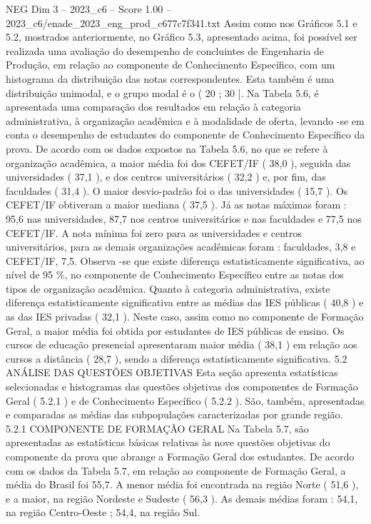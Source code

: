 \begin{textsample}{NEG Dim 3 – 2023\_c6 – Score 1.00 – 2023\_c6/enade\_2023\_eng\_prod\_c677c7f341.txt}
Assim como nos Gráficos 5.1 e 5.2, mostrados anteriormente, no Gráfico 5.3, apresentado acima, foi possível ser realizada uma avaliação do desempenho de concluintes de Engenharia de Produção, em relação ao componente de Conhecimento Específico, com um histograma da distribuição das notas correspondentes.
Esta também é uma distribuição unimodal, e o grupo modal é o ( 20 ; 30 ].
Na Tabela 5.6, é apresentada uma comparação dos resultados em relação à categoria administrativa, à organização acadêmica e à modalidade de oferta, levando -se em conta o desempenho de estudantes do componente de Conhecimento Específico da prova.
De acordo com os dados expostos na Tabela 5.6, no que se refere à organização acadêmica, a maior média foi dos CEFET/IF ( 38,0 ), seguida das universidades ( 37,1 ), e dos centros universitários ( 32,2 ) e, por fim, das faculdades ( 31,4 ).
O maior desvio-padrão foi o das universidades ( 15,7 ).
Os CEFET/IF obtiveram a maior mediana ( 37,5 ).
Já as notas máximas foram : 95,6 nas universidades, 87,7 nos centros universitários e nas faculdades e 77,5 nos CEFET/IF.
A nota mínima foi zero para as universidades e centros universitários, para as demais organizações acadêmicas foram : faculdades, 3,8 e CEFET/IF, 7,5.
Observa -se que existe diferença estatisticamente significativa, ao nível de 95 \%, no componente de Conhecimento Específico entre as notas dos tipos de organização acadêmica.
Quanto à categoria administrativa, existe diferença estatisticamente significativa entre as médias das IES públicas ( 40,8 ) e as das IES privadas ( 32,1 ).
Neste caso, assim como no componente de Formação Geral, a maior média foi obtida por estudantes de IES públicas de ensino.
Os cursos de educação presencial apresentaram maior média ( 38,1 ) em relação aos cursos a distância ( 28,7 ), sendo a diferença estatisticamente significativa. 5.2 ANÁLISE DAS QUESTÕES OBJETIVAS Esta seção apresenta estatísticas selecionadas e histogramas das questões objetivas dos componentes de Formação Geral ( 5.2.1 ) e de Conhecimento Específico ( 5.2.2 ).
São, também, apresentadas e comparadas as médias das subpopulações caracterizadas por grande região. 5.2.1 COMPONENTE DE FORMAÇÃO GERAL Na Tabela 5.7, são apresentadas as estatísticas básicas relativas às nove questões objetivas do componente da prova que abrange a Formação Geral dos estudantes.
De acordo com os dados da Tabela 5.7, em relação ao componente de Formação Geral, a média do Brasil foi 55,7.
A menor média foi encontrada na região Norte ( 51,6 ), e a maior, na região Nordeste e Sudeste ( 56,3 ).
As demais médias foram : 54,1, na região Centro-Oeste ; 54,4, na região Sul.

\end{textsample}
